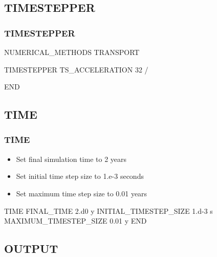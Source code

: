 \documentclass{beamer}
\begin{document}
\subsection{TIMESTEPPER}

\begin{frame}[fragile]\frametitle{\bf TIMESTEPPER}

\begin{semiverbatim}
NUMERICAL_METHODS TRANSPORT

  TIMESTEPPER
    TS_ACCELERATION 32
  /
  
END
\end{semiverbatim}

\end{frame}
\subsection{TIME}

\begin{frame}[fragile]\frametitle{\bf TIME}

\begin{itemize}
\item Set final simulation time to 2 years
\item Set initial time step size to 1.e-3 seconds
\item Set maximum time step size to 0.01 years
\end{itemize}

\begin{semiverbatim}

TIME
  FINAL_TIME 2.d0 y
  INITIAL_TIMESTEP_SIZE 1.d-3 s
  MAXIMUM_TIMESTEP_SIZE 0.01 y
END
\end{semiverbatim}

\end{frame}

\subsection{OUTPUT}
\end{document}
